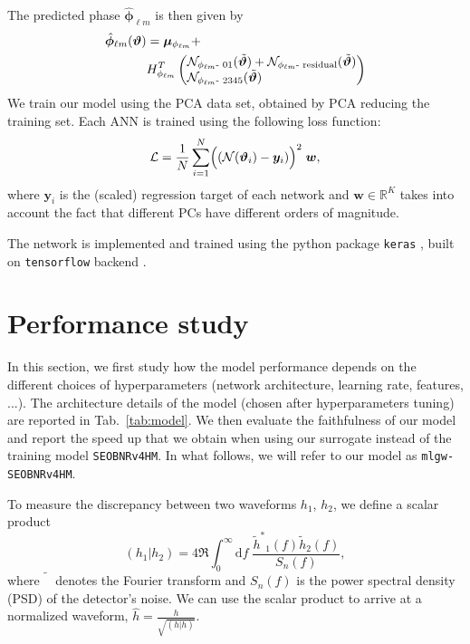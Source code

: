 \documentclass[twocolumn,showpacs,preprintnumbers,nofootinbib,prd,
superscriptaddress,10pt]{revtex4-2}
\newcommand{\R}{\mathbb{R}}
\newcommand{\rescalar}[2]{( #1 |#2 )}
\begin{document}
The predicted phase $\hat{\boldsymbol{\phi}}_{\ell m}$ is then given by
%
\begin{align}
	\hat{\boldsymbol{\phi}}_{\ell m}(\boldsymbol{\vartheta}) &= \boldsymbol{\mu}_{\phi_{\ell m}}  + \nonumber\\
	& H_{\phi_{\ell m}}^T 
	\begin{pmatrix}
        \mathcal{N}_{\phi_{\ell m}\text{- 01}}(\tilde{\boldsymbol{\vartheta}}) + \mathcal{N}_{\phi_{\ell m}\text{- residual}}(\tilde{\boldsymbol{\vartheta}}) \\
        \mathcal{N}_{\phi_{\ell m}\text{- 2345}}(\tilde{\boldsymbol{\vartheta}}) \hfill
	 \end{pmatrix} \label{eq:ph_pred}
\end{align}
%
We train our model using the PCA data set, obtained by PCA reducing the training set. Each ANN is trained using the following loss function:
\begin{equation}\label{eq:loss}
	\mathcal{L} = \frac{1}{N} \sum_{i=1}^N \Bigl((\mathcal{N}(\boldsymbol{\vartheta}_i) - \boldsymbol{y}_i)\Bigr)^2 \; \boldsymbol{w},
\end{equation}
%
where $\boldsymbol{y}_i$ is the (scaled) regression target of each network and $\boldsymbol{w} \in \R^K$ takes into account the fact that different PCs have different orders of magnitude.

The network is implemented and trained using the python package \texttt{keras} \cite{chollet2015keras}, built on \texttt{tensorflow} backend \cite{tensorflow2015-whitepaper}.

\section{Performance study}
\label{sec:performance}
In this section, we first study how the model performance depends on the different choices of hyperparameters 
(network architecture, learning rate, features, ...).
The architecture details of the model (chosen after hyperparameters tuning) are reported in Tab.~\ref{tab:model}.
We then evaluate the faithfulness of our model and report the speed up that we obtain when using our surrogate instead of the training model \texttt{SEOBNRv4HM}.
In what follows, we will refer to our model as \texttt{mlgw-SEOBNRv4HM}.

To measure the discrepancy between two waveforms  $h_1$, $h_2$, we define a scalar product
\begin{equation}
	\rescalar{h_1}{h_2} = 4 \Re \int_{0}^{\infty} \text{d}f \; \frac{{\tilde{h}^*}_1(f) \tilde{h}_2(f)}{S_n(f)},
\end{equation}
where $\tilde{\phantom{h}}$ denotes the Fourier transform and $S_n(f)$ is the power spectral density (PSD) of the detector's noise.
We can use the scalar product to arrive at a normalized waveform, $\hat{h} = \frac{h}{\sqrt{\rescalar{h}{h}}}$.
\end{document}
